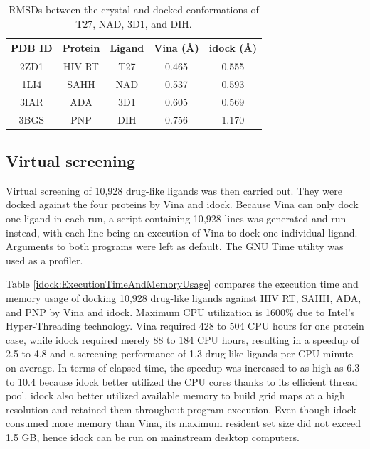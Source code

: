 \begin{table}
\centering
\begin{tabular*}
{\linewidth}
{@{\extracolsep{\fill}}ccccc}
\toprule
PDB ID & Protein & Ligand & Vina (\AA) & idock (\AA)\\
\midrule
2ZD1 & HIV RT & T27 & 0.465 & 0.555\\
1LI4 & SAHH   & NAD & 0.537 & 0.593\\
3IAR & ADA    & 3D1 & 0.605 & 0.569\\
3BGS & PNP    & DIH & 0.756 & 1.170\\
\bottomrule
\end{tabular*}
\caption{RMSDs between the crystal and docked conformations of T27, NAD, 3D1, and DIH.}
\label{idock:RMSD}
\end{table}

\subsection{Virtual screening}

Virtual screening of 10,928 drug-like ligands was then carried out. They were docked against the four proteins by Vina and idock. Because Vina can only dock one ligand in each run, a script containing 10,928 lines was generated and run instead, with each line being an execution of Vina to dock one individual ligand. Arguments to both programs were left as default. The GNU Time utility was used as a profiler.

Table \ref{idock:ExecutionTimeAndMemoryUsage} compares the execution time and memory usage of docking 10,928 drug-like ligands against HIV RT, SAHH, ADA, and PNP by Vina and idock. Maximum CPU utilization is 1600\% due to Intel's Hyper-Threading technology. Vina required 428 to 504 CPU hours for one protein case, while idock required merely 88 to 184 CPU hours, resulting in a speedup of 2.5 to 4.8 and a screening performance of 1.3 drug-like ligands per CPU minute on average. In terms of elapsed time, the speedup was increased to as high as 6.3 to 10.4 because idock better utilized the CPU cores thanks to its efficient thread pool. idock also better utilized available memory to build grid maps at a high resolution and retained them throughout program execution. Even though idock consumed more memory than Vina, its maximum resident set size did not exceed 1.5 GB, hence idock can be run on mainstream desktop computers.

